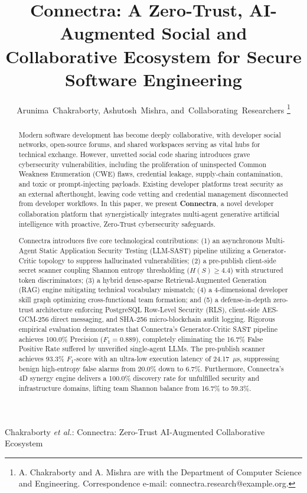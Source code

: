 \documentclass[journal,10pt,twocolumn]{IEEEtran}
\begin{document}
\title{Connectra: A Zero-Trust, AI-Augmented Social and Collaborative Ecosystem for Secure Software Engineering}

\author{Arunima~Chakraborty,
        Ashutosh~Mishra,
        and~Collaborating~Researchers%
\thanks{A. Chakraborty and A. Mishra are with the Department of Computer Science and Engineering. Correspondence e-mail: connectra.research@example.org.}}

%
{Chakraborty \MakeLowercase{\textit{et al.}}: Connectra: Zero-Trust AI-Augmented Collaborative Ecosystem}

\maketitle

\begin{abstract}
Modern software development has become deeply collaborative, with developer social networks, open-source forums, and shared workspaces serving as vital hubs for technical exchange. However, unvetted social code sharing introduces grave cybersecurity vulnerabilities, including the proliferation of uninspected Common Weakness Enumeration (CWE) flaws, credential leakage, supply-chain contamination, and toxic or prompt-injecting payloads. Existing developer platforms treat security as an external afterthought, leaving code vetting and credential management disconnected from developer workflows. In this paper, we present \textbf{Connectra}, a novel developer collaboration platform that synergistically integrates multi-agent generative artificial intelligence with proactive, Zero-Trust cybersecurity safeguards. 

Connectra introduces five core technological contributions: (1) an asynchronous Multi-Agent Static Application Security Testing (LLM-SAST) pipeline utilizing a Generator-Critic topology to suppress hallucinated vulnerabilities; (2) a pre-publish client-side secret scanner coupling Shannon entropy thresholding ($H(S) \ge 4.4$) with structured token discriminators; (3) a hybrid dense-sparse Retrieval-Augmented Generation (RAG) engine mitigating technical vocabulary mismatch; (4) a 4-dimensional developer skill graph optimizing cross-functional team formation; and (5) a defense-in-depth zero-trust architecture enforcing PostgreSQL Row-Level Security (RLS), client-side AES-GCM-256 direct messaging, and SHA-256 micro-blockchain audit logging. Rigorous empirical evaluation demonstrates that Connectra's Generator-Critic SAST pipeline achieves 100.0\% Precision ($F_1 = 0.889$), completely eliminating the 16.7\% False Positive Rate suffered by unverified single-agent LLMs. The pre-publish scanner achieves 93.3\% $F_1$-score with an ultra-low execution latency of 24.17~$\mu$s, suppressing benign high-entropy false alarms from 20.0\% down to 6.7\%. Furthermore, Connectra's 4D synergy engine delivers a 100.0\% discovery rate for unfulfilled security and infrastructure domains, lifting team Shannon balance from 16.7\% to 59.3\%.
\end{abstract}
\end{document}
